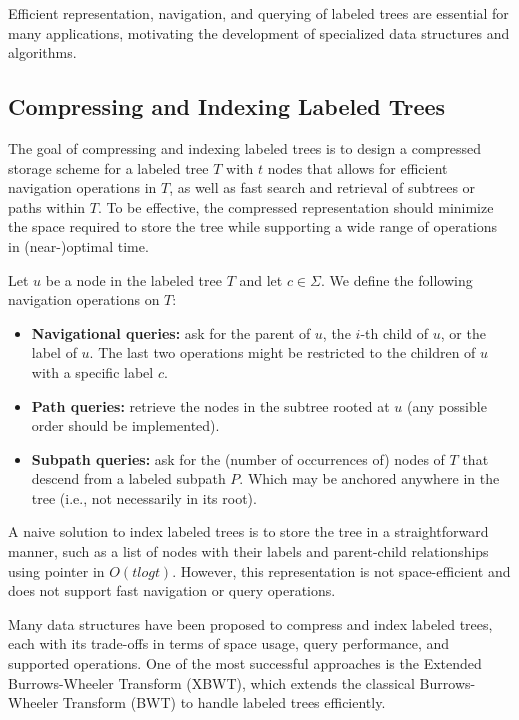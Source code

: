Efficient representation, navigation, and querying of labeled trees are essential for many applications, motivating the development of specialized data structures and algorithms. 

\subsection{Compressing and Indexing Labeled Trees} \label{compandindexinglabtree}
The goal of compressing and indexing labeled trees is to design a compressed storage scheme for a labeled tree $T$ with $t$ nodes that allows for efficient navigation operations in $T$, as well as fast search and retrieval of subtrees or paths within $T$. To be effective, the compressed representation should minimize the space required to store the tree while supporting a wide range of operations in (near-)optimal time.

Let $u$ be a node in the labeled tree $T$ and let $c \in \Sigma$. We define the following navigation operations on $T$:
\begin{itemize}
    \item \textbf{Navigational queries:} ask for the parent of $u$, the $i$-th child of $u$, or the label of $u$. The last two operations might be restricted to the children of $u$ with a specific label $c$.
    \item \textbf{Path queries:} retrieve the nodes in the subtree rooted at $u$ (any possible order should be implemented).
    \item \textbf{Subpath queries:} ask for the (number of occurrences of) nodes of $T$ that descend from a labeled subpath $P$. Which may be anchored anywhere in the tree (i.e., not necessarily in its root). 
\end{itemize}

A naive solution to index labeled trees is to store the tree in a straightforward manner, such as a list of nodes with their labels and parent-child relationships using pointer in $O(t log t)$. However, this representation is not space-efficient and does not support fast navigation or query operations. 

Many data structures have been proposed to compress and index labeled trees, each with its trade-offs in terms of space usage, query performance, and supported operations. One of the most successful approaches is the Extended Burrows-Wheeler Transform (XBWT), which extends the classical Burrows-Wheeler Transform (BWT) to handle labeled trees efficiently. 

